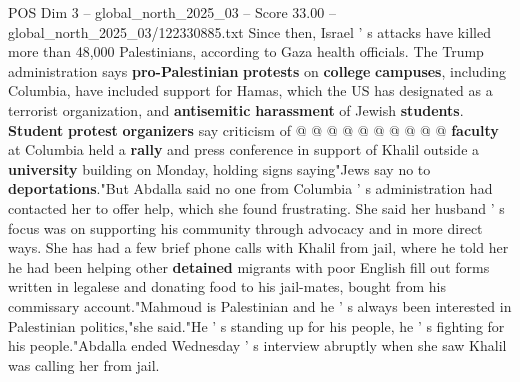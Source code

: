\begin{textsample}{POS Dim 3 – global\_north\_2025\_03 – Score 33.00 – global\_north\_2025\_03/122330885.txt}
Since then, Israel ' s attacks have killed more than 48,000 Palestinians, according to Gaza health officials.
The Trump administration says \textbf{pro-Palestinian} \textbf{protests} on \textbf{college} \textbf{campuses}, including Columbia, have included support for Hamas, which the US has designated as a terrorist organization, and \textbf{antisemitic} \textbf{harassment} of Jewish \textbf{students}. \textbf{Student} \textbf{protest} \textbf{organizers} say criticism of @ @ @ @ @ @ @ @ @ @ \textbf{faculty} at Columbia held a \textbf{rally} and press conference in support of Khalil outside a \textbf{university} building on Monday, holding signs saying"Jews say no to \textbf{deportations}."But Abdalla said no one from Columbia ' s administration had contacted her to offer help, which she found frustrating.
She said her husband ' s focus was on supporting his community through advocacy and in more direct ways.
She has had a few brief phone calls with Khalil from jail, where he told her he had been helping other \textbf{detained} migrants with poor English fill out forms written in legalese and donating food to his jail-mates, bought from his commissary account."Mahmoud is Palestinian and he ' s always been interested in Palestinian politics,"she said."He ' s standing up for his people, he ' s fighting for his people."Abdalla ended Wednesday ' s interview abruptly when she saw Khalil was calling her from jail.

\end{textsample}
